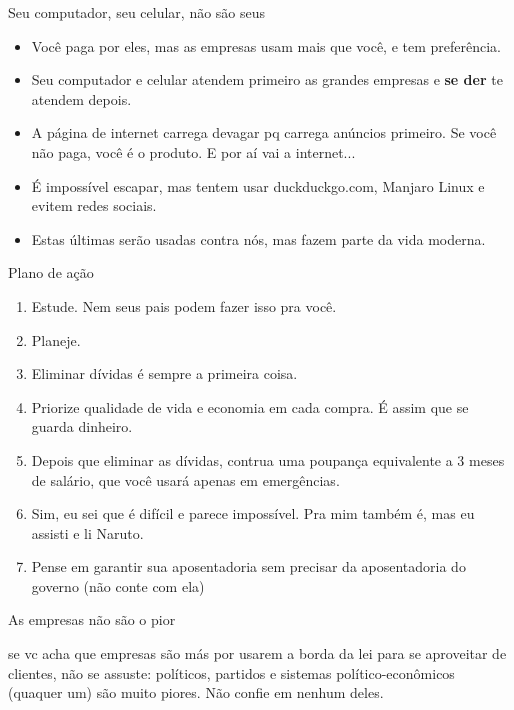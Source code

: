 \documentclass[]{beamer}
\begin{document}
\begin{frame}{Seu computador, seu celular, não são seus}

  \begin{itemize}
  \item Você paga por eles, mas as empresas usam mais que
    você, e tem preferência.
  \item Seu computador e celular atendem primeiro as grandes
    empresas e \textbf{se der} te atendem depois.
    \pause
  \item A página de internet carrega devagar pq carrega
    anúncios primeiro. Se você não paga, você é o produto. E
    por aí vai a internet...
  \item É impossível escapar, mas tentem usar
    duckduckgo.com, Manjaro Linux e evitem redes sociais.
    \pause
  \item  Estas últimas serão usadas contra nós, mas fazem parte
    da vida moderna.
  \end{itemize}

\end{frame}

  \begin{frame}{Plano de ação}

    \begin{enumerate}
    \item Estude. Nem seus pais podem fazer isso pra você. \pause
    \item Planeje.\pause
    \item Eliminar dívidas é sempre a primeira coisa.\pause
    \item Priorize qualidade de vida e economia em cada
      compra. É assim que se guarda dinheiro.\pause
    \item Depois que eliminar as dívidas, contrua uma
      poupança equivalente a 3 meses de salário, que você
      usará apenas em emergências.\pause
    \item Sim, eu sei que é difícil e parece impossível. Pra
      mim também é, mas eu assisti e li Naruto.\pause
    \item Pense em garantir sua aposentadoria sem precisar
      da aposentadoria do governo (não conte com ela)
    \end{enumerate}

   \end{frame} 


\begin{frame}[standout]{As empresas não são o pior}

  se vc acha que empresas são más por usarem a borda da lei para se
  aproveitar de clientes, não se assuste: políticos, partidos e sistemas
  político-econômicos (quaquer um) são muito piores. Não confie em nenhum deles. 
\end{frame}
\end{document}
